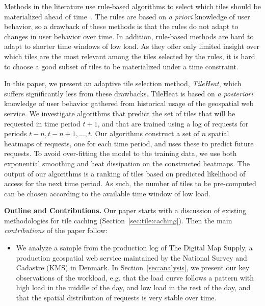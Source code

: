 \documentclass[11pt, oneside]{report}
\newcommand{\minisec}[1]{\noindent\textbf{#1.}}
\begin{document}
{%
Methods in the literature use rule-based algorithms to select which tiles should be materialized ahead of time~\cite{quinn2010prediction}. The rules are based on \emph{a priori} knowledge of user behavior, so a drawback of these methods is that the rules do not adapt to changes in user behavior over time. In addition, rule-based methods are hard to adapt to shorter time windows of low load. As they offer only limited insight over which tiles are the most relevant among the tiles selected by the rules, it is hard to choose a good subset of tiles to be materialized under a time constraint.  

In this paper, we present an adaptive tile selection method, \emph{TileHeat}, which suffers significantly less from these drawbacks. TileHeat is based on  \emph{a posteriori} knowledge of user behavior gathered from historical usage of the geospatial web service. We investigate algorithms that predict the set of tiles that will be requested in time period $t + 1$, and that are trained using a log of requests for periods $t-n, t -n + 1, \ldots, t$. Our algorithms construct a set of $n$ spatial heatmaps of requests, one for each time period, and uses these to predict future requests. To avoid over-fitting the model to the training data, we use both exponential smoothing and heat dissipation on the constructed heatmaps. The output of our algorithms is a ranking of tiles based on predicted likelihood of access for the next time period. As such, the number of tiles to be pre-computed can be chosen according to the available time window of low load.	

\minisec{Outline and Contributions}
Our paper starts with a discussion of existing methodologies for tile caching (Section~\ref{sec:tile:caching}). Then the main \emph{contributions} of the paper follow:
%
\begin{itemize}

\item We analyze a sample from the production log of The Digital Map Supply, a production geospatial web service maintained by the National Survey and Cadastre (KMS) in Denmark. In Section~\ref{sec:analysis}, we present our key observations of the workload, e.g. that the load curve follows a pattern with high load in the middle of the day, and low load in the rest of the day, and that the spatial distribution of requests is very stable over time.


\end{itemize}}
\end{document}
